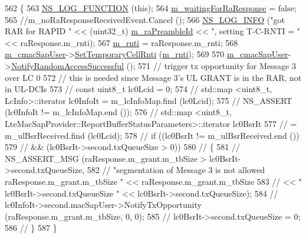 \begin{DoxyCode}
562 \{
563   \hyperlink{log-macros-disabled_8h_a90b90d5bad1f39cb1b64923ea94c0761}{NS\_LOG\_FUNCTION} (\textcolor{keyword}{this});
564   \hyperlink{classns3_1_1MmWaveUeMac_ab1cbf9aed2d6c3a74370f5f4fbd68910}{m\_waitingForRaResponse} = \textcolor{keyword}{false};
565   \textcolor{comment}{//m\_noRaResponseReceivedEvent.Cancel ();}
566   \hyperlink{group__logging_gafbd73ee2cf9f26b319f49086d8e860fb}{NS\_LOG\_INFO} (\textcolor{stringliteral}{"got RAR for RAPID "} << (uint32\_t) \hyperlink{classns3_1_1MmWaveUeMac_a0b48ec5205352aee44ececbeb2c49134}{m\_raPreambleId} << \textcolor{stringliteral}{", setting
       T-C-RNTI = "} << raResponse.m\_rnti);
567   \hyperlink{classns3_1_1MmWaveUeMac_a73d6bc08e75e3a20c5fbaf3113cf40f5}{m\_rnti} = raResponse.m\_rnti;
568   \hyperlink{classns3_1_1MmWaveUeMac_ad412658a2ce51f06e8a27dbfdf8f9cce}{m\_cmacSapUser}->\hyperlink{classns3_1_1LteUeCmacSapUser_ad094e1492ca1603efa22398ba854af77}{SetTemporaryCellRnti} (\hyperlink{classns3_1_1MmWaveUeMac_a73d6bc08e75e3a20c5fbaf3113cf40f5}{m\_rnti});
569   
570   \hyperlink{classns3_1_1MmWaveUeMac_ad412658a2ce51f06e8a27dbfdf8f9cce}{m\_cmacSapUser}->\hyperlink{classns3_1_1LteUeCmacSapUser_a697ea79347ad5d2ff5e136240255b8e0}{NotifyRandomAccessSuccessful} ();
571   \textcolor{comment}{// trigger tx opportunity for Message 3 over LC 0}
572   \textcolor{comment}{// this is needed since Message 3's UL GRANT is in the RAR, not in UL-DCIs}
573   \textcolor{comment}{// const uint8\_t lc0Lcid = 0;}
574   \textcolor{comment}{// std::map <uint8\_t, LcInfo>::iterator lc0InfoIt = m\_lcInfoMap.find (lc0Lcid);}
575   \textcolor{comment}{// NS\_ASSERT (lc0InfoIt != m\_lcInfoMap.end ());}
576   \textcolor{comment}{// std::map <uint8\_t, LteMacSapProvider::ReportBufferStatusParameters>::iterator lc0BsrIt}
577   \textcolor{comment}{//   = m\_ulBsrReceived.find (lc0Lcid);}
578   \textcolor{comment}{// if ((lc0BsrIt != m\_ulBsrReceived.end ())}
579   \textcolor{comment}{//     && (lc0BsrIt->second.txQueueSize > 0))}
580   \textcolor{comment}{//   \{}
581   \textcolor{comment}{//     NS\_ASSERT\_MSG (raResponse.m\_grant.m\_tbSize > lc0BsrIt->second.txQueueSize, }
582   \textcolor{comment}{//                    "segmentation of Message 3 is not allowed raResponse.m\_grant.m\_tbSize " <<
       raResponse.m\_grant.m\_tbSize }
583   \textcolor{comment}{//                    << " lc0BsrIt->second.txQueueSize " << lc0BsrIt->second.txQueueSize);}
584   \textcolor{comment}{//     lc0InfoIt->second.macSapUser->NotifyTxOpportunity (raResponse.m\_grant.m\_tbSize, 0, 0); }
585   \textcolor{comment}{//     lc0BsrIt->second.txQueueSize = 0;}
586   \textcolor{comment}{//   \}}
587 \}
\end{DoxyCode}


